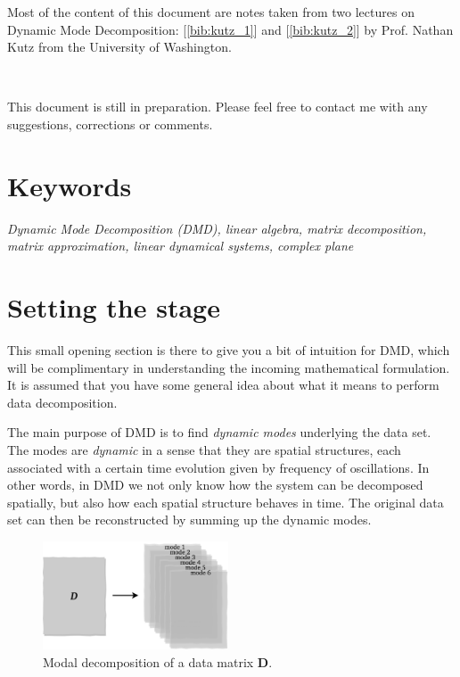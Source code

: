 \documentclass[10pt,twocolumn]{article}
\begin{document}
Most of the content of this document are notes taken from two lectures on Dynamic Mode Decomposition: [\ref{bib:kutz_1}] and [\ref{bib:kutz_2}] by Prof. Nathan Kutz from the University of Washington. 

\,\,

This document is still in preparation. Please feel free to contact me with any suggestions, corrections or comments.

\section*{Keywords}

\textit{Dynamic Mode Decomposition (DMD), linear algebra, matrix decomposition, matrix approximation, linear dynamical systems, complex plane}



\tableofcontents


\newpage

\section{Setting the stage}

This small opening section is there to give you a bit of intuition for DMD, which will be complimentary in understanding the incoming mathematical formulation. It is assumed that you have some general idea about what it means to perform data decomposition.

The main purpose of DMD is to find \textit{dynamic modes} underlying the data set. The modes are \textit{dynamic} in a sense that they are spatial structures, each associated with a certain time evolution given by frequency of oscillations. In other words, in DMD we not only know how the system can be decomposed spatially, but also how each spatial structure behaves in time. The original data set can then be reconstructed by summing up the dynamic modes. 

\begin{figure}[H]
\centering\includegraphics[width=5.5cm]{DMD-modal-decomposition.png}
\caption{Modal decomposition of a data matrix $\bm{D}$.}
\label{fig:modal-decomposition}
\end{figure}
\end{document}
